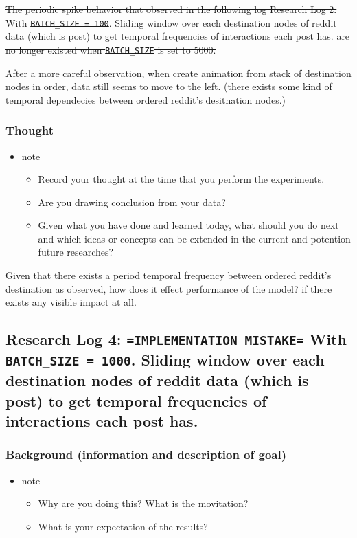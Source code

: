 \documentclass[11pt]{article}
\begin{document}
\sout{The periodic spike behavior that observed in the following log Research Log 2: With \texttt{BATCH\_SIZE = 100}. Sliding window over each destination nodes of reddit data (which is post) to get temporal frequencies of interactions each post has. are no longer existed when \texttt{BATCH\_SIZE} is set to 5000.}

After a more careful observation, when create animation from stack of destination nodes in order, data still seems to move to the left. (there exists some kind of temporal dependecies between ordered reddit's desitnation nodes.)

\subsubsection{Thought}
\label{sec:org17ff010}
\begin{itemize}
\item note
\begin{itemize}
\item Record your thought at the time that you perform the experiments.
\item Are you drawing conclusion from your data?
\item Given what you have done and learned today, what should you do next and which ideas or concepts can be extended in the current and potention future researches?
\end{itemize}
\end{itemize}

Given that there exists a period temporal frequency between ordered reddit's destination as observed, how does it effect performance of the model? if there exists any visible impact at all.

\subsection{Research Log 4: \texttt{=IMPLEMENTATION MISTAKE=} With \texttt{BATCH\_SIZE = 1000}. Sliding window over each destination nodes of reddit data (which is post) to get temporal frequencies of interactions each post has.}
\label{sec:org7e32d7d}
\subsubsection{Background (information and description of goal)}
\label{sec:org3a26701}
\begin{itemize}
\item note
\begin{itemize}
\item Why are you doing this? What is the movitation?
\item What is your expectation of the results?
\end{itemize}
\end{itemize}
\end{document}
